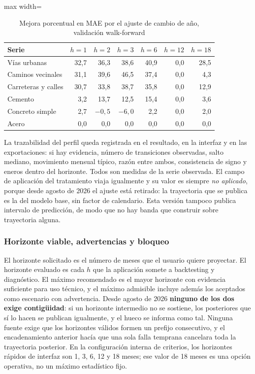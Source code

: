 \documentclass[12pt,letterpaper]{article}
\begin{document}
\begin{table}[H]
\centering
\caption{Mejora porcentual en MAE por el ajuste de cambio de año, validación walk-forward}
\label{tab:validacion_ajuste_calendario}
\vspace{\baselineskip}
\scriptsize
\begin{adjustbox}{max width=\textwidth}
\begin{tabular}{lrrrrrr}
\toprule
\textbf{Serie} & \(h=1\) & \(h=2\) & \(h=3\) & \(h=6\) & \(h=12\) & \(h=18\) \\
\midrule
Vías urbanas & 32,7 & 36,3 & 38,6 & 40,9 & 0,0 & 28,5 \\
Caminos vecinales & 31,1 & 39,6 & 46,5 & 37,4 & 0,0 & 4,3 \\
Carreteras y calles & 30,7 & 33,8 & 38,7 & 35,8 & 0,0 & 12,9 \\
Cemento & 3,2 & 13,7 & 12,5 & 15,4 & 0,0 & 3,6 \\
Concreto simple & 2,7 & \(-0{,}5\) & \(-6{,}0\) & 2,2 & 0,0 & 2,0 \\
Acero & 0,0 & 0,0 & 0,0 & 0,0 & 0,0 & 0,0 \\
\bottomrule
\end{tabular}
\end{adjustbox}
\end{table}

La trazabilidad del perfil queda registrada en el resultado, en la interfaz y en las exportaciones: si hay evidencia, número de transiciones observadas, salto mediano, movimiento mensual típico, razón entre ambos, consistencia de signo y eneros dentro del horizonte. Todos son medidas de la serie observada. El campo de aplicación del tratamiento viaja igualmente y su valor es siempre \emph{no aplicado}, porque desde agosto de 2026 el ajuste está retirado: la trayectoria que se publica es la del modelo base, sin factor de calendario. Esta versión tampoco publica intervalo de predicción, de modo que no hay banda que construir sobre trayectoria alguna.

\subsubsection{Horizonte viable, advertencias y bloqueo}

El horizonte solicitado es el número de meses que el usuario quiere proyectar. El horizonte evaluado es cada \(h\) que la aplicación somete a backtesting y diagnóstico. El máximo recomendado es el mayor horizonte con evidencia suficiente para uso técnico, y el máximo admisible incluye además los aceptados como escenario con advertencia. Desde agosto de 2026 \textbf{ninguno de los dos exige contigüidad}: si un horizonte intermedio no se sostiene, los posteriores que sí lo hacen se publican igualmente, y el hueco se informa como tal. Ninguna fuente exige que los horizontes válidos formen un prefijo consecutivo, y el encadenamiento anterior hacía que una sola falla temprana cancelara toda la trayectoria posterior. En la configuración interna de criterios, los horizontes rápidos de interfaz son 1, 3, 6, 12 y 18 meses; ese valor de 18 meses es una opción operativa, no un máximo estadístico fijo.
\end{document}
